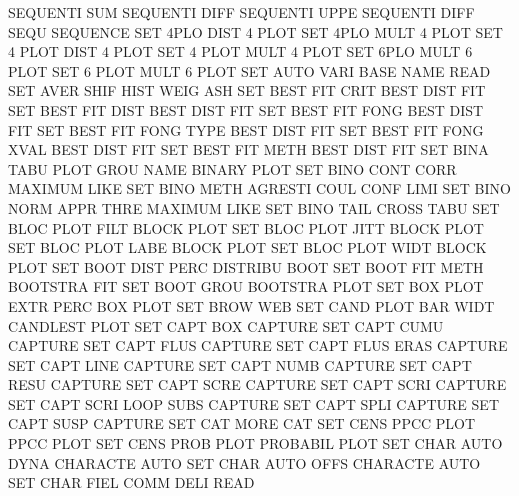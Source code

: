 SEQUENTI SUM                            SEQUENTI DIFF
SEQUENTI UPPE                           SEQUENTI DIFF
SEQU                                    SEQUENCE
SET      4PLO DIST                      4        PLOT
SET      4PLO MULT                      4        PLOT
SET      4    PLOT DIST                 4        PLOT
SET      4    PLOT MULT                 4        PLOT
SET      6PLO MULT                      6        PLOT
SET      6    PLOT MULT                 6        PLOT
SET      AUTO VARI BASE NAME            READ
SET      AVER SHIF HIST WEIG            ASH
SET      BEST FIT  CRIT                 BEST     DIST FIT
SET      BEST FIT  DIST                 BEST     DIST FIT
SET      BEST FIT  FONG                 BEST     DIST FIT
SET      BEST FIT  FONG TYPE            BEST     DIST FIT
SET      BEST FIT  FONG XVAL            BEST     DIST FIT
SET      BEST FIT  METH                 BEST     DIST FIT
SET      BINA TABU PLOT GROU NAME       BINARY   PLOT
SET      BINO CONT CORR                 MAXIMUM  LIKE
SET      BINO METH                      AGRESTI  COUL CONF LIMI
SET      BINO NORM APPR THRE            MAXIMUM  LIKE
SET      BINO TAIL                      CROSS    TABU
SET      BLOC PLOT FILT                 BLOCK    PLOT
SET      BLOC PLOT JITT                 BLOCK    PLOT
SET      BLOC PLOT LABE                 BLOCK    PLOT
SET      BLOC PLOT WIDT                 BLOCK    PLOT
SET      BOOT DIST PERC                 DISTRIBU BOOT
SET      BOOT FIT  METH                 BOOTSTRA FIT
SET      BOOT GROU                      BOOTSTRA PLOT
SET      BOX  PLOT EXTR PERC            BOX      PLOT
SET      BROW                           WEB
SET      CAND PLOT BAR WIDT             CANDLEST PLOT
SET      CAPT BOX                       CAPTURE
SET      CAPT CUMU                      CAPTURE
SET      CAPT FLUS                      CAPTURE
SET      CAPT FLUS ERAS                 CAPTURE
SET      CAPT LINE                      CAPTURE
SET      CAPT NUMB                      CAPTURE
SET      CAPT RESU                      CAPTURE
SET      CAPT SCRE                      CAPTURE
SET      CAPT SCRI                      CAPTURE
SET      CAPT SCRI LOOP SUBS            CAPTURE
SET      CAPT SPLI                      CAPTURE
SET      CAPT SUSP                      CAPTURE
SET      CAT  MORE                      CAT
SET      CENS PPCC PLOT                 PPCC     PLOT
SET      CENS PROB PLOT                 PROBABIL PLOT
SET      CHAR AUTO DYNA                 CHARACTE AUTO
SET      CHAR AUTO OFFS                 CHARACTE AUTO
SET      CHAR FIEL COMM DELI            READ
